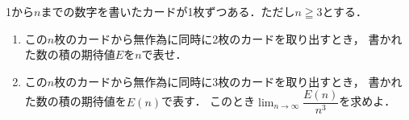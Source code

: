 \documentclass[../../main.tex]{subfiles}
\begin{document}
1から$n$までの数字を書いたカードが1枚ずつある．ただし$n \geqq 3$とする．
\begin{enumerate}
  \item この$n$枚のカードから無作為に同時に2枚のカードを取り出すとき，
    書かれた数の積の期待値$E$を$n$で表せ．
  \item この$n$枚のカードから無作為に同時に3枚のカードを取り出すとき，
    書かれた数の積の期待値を$E(n)$で表す．
    このとき$\displaystyle\lim_{n\to\infty}\dfrac{E(n)}{n^3}$を求めよ．
\end{enumerate}
\end{document}
